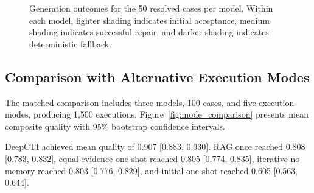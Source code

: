 \documentclass[conference]{IEEEtran}
\begin{document}
\begin{figure}[!t]
{
}
\caption{Generation outcomes for the 50 resolved cases per model.
Within each model, lighter shading indicates initial acceptance,
medium shading indicates successful repair, and darker shading
indicates deterministic fallback.}
\label{fig:validation_paths}
\end{figure}

\subsection{Comparison with Alternative Execution Modes}

The matched comparison includes three models, 100 cases, and five
execution modes, producing 1,500 executions.
Figure~\ref{fig:mode_comparison} presents mean composite quality with
95\% bootstrap confidence intervals.

DeepCTI achieved mean quality of 0.907 [0.883, 0.930].
RAG once reached 0.808 [0.783, 0.832], equal-evidence one-shot
reached 0.805 [0.774, 0.835], iterative no-memory reached
0.803 [0.776, 0.829], and initial one-shot reached
0.605 [0.563, 0.644].
\end{document}
